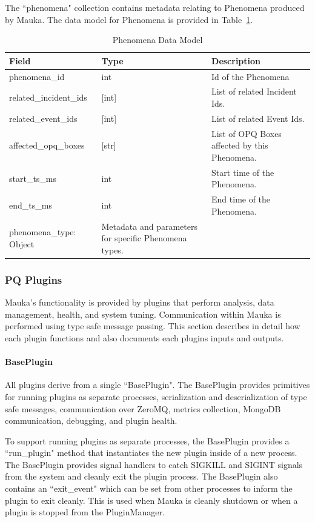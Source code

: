 The ``phenomena" collection contains metadata relating to Phenomena produced by Mauka. The data model for Phenomena is provided in Table~\ref{table:phenomena_data_model}.

\begin{table}[H]
	\centering
	\caption{Phenomena Data Model}
	\begin{tabularx}{\textwidth}{XlX}
		\toprule
		\textbf{Field} & \textbf{Type} & \textbf{Description} \\
		\midrule
		phenomena\_id & int & Id of the Phenomena \\
		related\_incident\_ids & [int] & List of related Incident Ids. \\
		related\_event\_ids & [int] & List of related Event Ids. \\
		affected\_opq\_boxes & [str] & List of OPQ Boxes affected by this Phenomena. \\
		start\_ts\_ms & int & Start time of the Phenomena. \\
		end\_ts\_ms & int & End time of the Phenomena. \\
		phenomena\_type: Object & Metadata and parameters for specific Phenomena types. \\
		\bottomrule
	\end{tabularx}
	\label{table:phenomena_data_model}
\end{table}

\subsubsection{PQ Plugins}\label{ssec:pq_plugins}
Mauka's functionality is provided by plugins that perform analysis, data management, health, and system tuning. Communication within Mauka is performed using type safe message passing. This section describes in detail how each plugin functions and also documents each plugins inputs and outputs.

\paragraph{BasePlugin}
All plugins derive from a single ``BasePlugin". The BasePlugin provides primitives for running plugins as separate processes, serialization and deserialization of type safe messages, communication over ZeroMQ, metrics collection, MongoDB communication, debugging, and plugin health.

To support running plugins as separate processes, the BasePlugin provides a ``run\_plugin" method that instantiates the new plugin inside of a new process. The BasePlugin provides signal handlers to catch SIGKILL and SIGINT signals from the system and cleanly exit the plugin process. The BasePlugin also contains an ``exit\_event" which can be set from other processes to inform the plugin to exit cleanly. This is used when Mauka is cleanly shutdown or when a plugin is stopped from the PluginManager.

